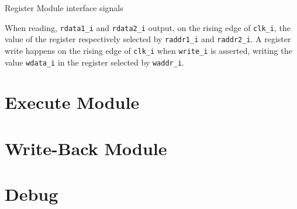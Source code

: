 \begin{table}[H]
  \centering
  
  \caption{Register Module interface signals}
  \label{tab:regm-interface}
\end{table}

\begin{content}
  When reading, \texttt{rdata1\_i} and \texttt{rdata2\_i} output, on the rising edge of \texttt{clk\_i}, the value of the register respectively selected by \texttt{raddr1\_i} and \texttt{raddr2\_i}. A register write happens on the rising edge of \texttt{clk\_i} when \texttt{write\_i} is asserted, writing the value \texttt{wdata\_i} in the register selected by \texttt{waddr\_i}.
\end{content}

\newpage

\section{Execute Module}
\newpage

\section{Write-Back Module}
\newpage

\section{Debug}
\newpage
